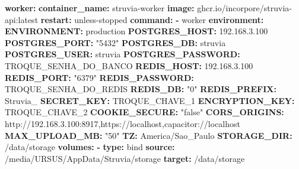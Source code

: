 \documentclass[
  10pt,
]{article}
\newenvironment{Shaded}{\begin{snugshade}}{\end{snugshade}}
\newcommand{\AttributeTok}[1]{\textcolor[rgb]{0.13,0.29,0.53}{#1}}
\newcommand{\FloatTok}[1]{\textcolor[rgb]{0.00,0.00,0.81}{#1}}
\newcommand{\FunctionTok}[1]{\textcolor[rgb]{0.13,0.29,0.53}{\textbf{#1}}}
\newcommand{\KeywordTok}[1]{\textcolor[rgb]{0.13,0.29,0.53}{\textbf{#1}}}
\newcommand{\StringTok}[1]{\textcolor[rgb]{0.31,0.60,0.02}{#1}}
\begin{document}
\begin{Shaded}
\begin{Highlighting}[]
\AttributeTok{  }\FunctionTok{worker}\KeywordTok{:}
\AttributeTok{    }\FunctionTok{container\_name}\KeywordTok{:}\AttributeTok{ struvia{-}worker}
\AttributeTok{    }\FunctionTok{image}\KeywordTok{:}\AttributeTok{ ghcr.io/incorpore/struvia{-}api:latest}
\AttributeTok{    }\FunctionTok{restart}\KeywordTok{:}\AttributeTok{ unless{-}stopped}
\AttributeTok{    }\FunctionTok{command}\KeywordTok{:}
\AttributeTok{      }\KeywordTok{{-}}\AttributeTok{ worker}
\AttributeTok{    }\FunctionTok{environment}\KeywordTok{:}
\AttributeTok{      }\FunctionTok{ENVIRONMENT}\KeywordTok{:}\AttributeTok{ production}
\AttributeTok{      }\FunctionTok{POSTGRES\_HOST}\KeywordTok{:}\AttributeTok{ }\FloatTok{192.168.3.100}
\AttributeTok{      }\FunctionTok{POSTGRES\_PORT}\KeywordTok{:}\AttributeTok{ }\StringTok{"5432"}
\AttributeTok{      }\FunctionTok{POSTGRES\_DB}\KeywordTok{:}\AttributeTok{ struvia}
\AttributeTok{      }\FunctionTok{POSTGRES\_USER}\KeywordTok{:}\AttributeTok{ struvia}
\AttributeTok{      }\FunctionTok{POSTGRES\_PASSWORD}\KeywordTok{:}\AttributeTok{ TROQUE\_SENHA\_DO\_BANCO}
\AttributeTok{      }\FunctionTok{REDIS\_HOST}\KeywordTok{:}\AttributeTok{ }\FloatTok{192.168.3.100}
\AttributeTok{      }\FunctionTok{REDIS\_PORT}\KeywordTok{:}\AttributeTok{ }\StringTok{"6379"}
\AttributeTok{      }\FunctionTok{REDIS\_PASSWORD}\KeywordTok{:}\AttributeTok{ TROQUE\_SENHA\_DO\_REDIS}
\AttributeTok{      }\FunctionTok{REDIS\_DB}\KeywordTok{:}\AttributeTok{ }\StringTok{"0"}
\AttributeTok{      }\FunctionTok{REDIS\_PREFIX}\KeywordTok{:}\AttributeTok{ Struvia\_}
\AttributeTok{      }\FunctionTok{SECRET\_KEY}\KeywordTok{:}\AttributeTok{ TROQUE\_CHAVE\_1}
\AttributeTok{      }\FunctionTok{ENCRYPTION\_KEY}\KeywordTok{:}\AttributeTok{ TROQUE\_CHAVE\_2}
\AttributeTok{      }\FunctionTok{COOKIE\_SECURE}\KeywordTok{:}\AttributeTok{ }\StringTok{"false"}
\AttributeTok{      }\FunctionTok{CORS\_ORIGINS}\KeywordTok{:}\AttributeTok{ http://192.168.3.100:8917,https://localhost,capacitor://localhost}
\AttributeTok{      }\FunctionTok{MAX\_UPLOAD\_MB}\KeywordTok{:}\AttributeTok{ }\StringTok{"50"}
\AttributeTok{      }\FunctionTok{TZ}\KeywordTok{:}\AttributeTok{ America/Sao\_Paulo}
\AttributeTok{      }\FunctionTok{STORAGE\_DIR}\KeywordTok{:}\AttributeTok{ /data/storage}
\AttributeTok{    }\FunctionTok{volumes}\KeywordTok{:}
\AttributeTok{      }\KeywordTok{{-}}\AttributeTok{ }\FunctionTok{type}\KeywordTok{:}\AttributeTok{ bind}
\AttributeTok{        }\FunctionTok{source}\KeywordTok{:}\AttributeTok{ /media/URSUS/AppData/Struvia/storage}
\AttributeTok{        }\FunctionTok{target}\KeywordTok{:}\AttributeTok{ /data/storage}

\end{Highlighting}
\end{Shaded}
\end{document}
